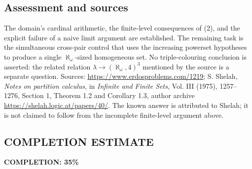 \subsection*{Assessment and sources}
The domain's cardinal arithmetic, the finite-level consequences of (2), and the explicit failure of a naive limit argument are established. The remaining task is the simultaneous cross-pair control that uses the increasing powerset hypotheses to produce a single $\aleph_\omega$-sized homogeneous set. No triple-colouring conclusion is asserted: the related relation $\lambda\to(\aleph_\omega,4)^3$ mentioned by the source is a separate question.
Sources: \url{https://www.erdosproblems.com/1219}; S. Shelah, \emph{Notes on partition calculus}, in \emph{Infinite and Finite Sets}, Vol. III (1975), 1257--1276, Section 1, Theorem 1.2 and Corollary 1.3, author archive \url{https://shelah.logic.at/papers/40/}. The known answer is attributed to Shelah; it is not claimed to follow from the incomplete finite-level argument above.
\subsection*{COMPLETION ESTIMATE}
\textbf{COMPLETION: 35\%}
